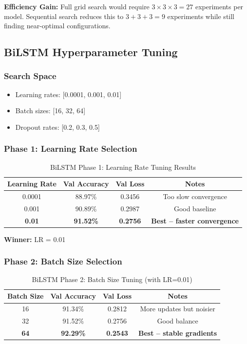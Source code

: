 \documentclass[12pt,a4paper]{article}
\begin{document}
\textbf{Efficiency Gain:} Full grid search would require $3 \times 3 \times 3 = 27$ experiments per model. Sequential search reduces this to $3 + 3 + 3 = 9$ experiments while still finding near-optimal configurations.

\subsection{BiLSTM Hyperparameter Tuning}

\subsubsection{Search Space}
\begin{itemize}
    \item Learning rates: [0.0001, 0.001, 0.01]
    \item Batch sizes: [16, 32, 64]
    \item Dropout rates: [0.2, 0.3, 0.5]
\end{itemize}

\subsubsection{Phase 1: Learning Rate Selection}
\begin{table}[H]
\centering
\begin{tabular}{@{}cccc@{}}
\toprule
\textbf{Learning Rate} & \textbf{Val Accuracy} & \textbf{Val Loss} & \textbf{Notes} \\ \midrule
0.0001 & 88.97\% & 0.3456 & Too slow convergence \\
0.001 & 90.89\% & 0.2987 & Good baseline \\
\rowcolor{green!20}\textbf{0.01} & \textbf{91.52\%} & \textbf{0.2756} & \textbf{Best -- faster convergence} \\ \bottomrule
\end{tabular}
\caption{BiLSTM Phase 1: Learning Rate Tuning Results}
\label{tab:bilstm_lr}
\end{table}

\textbf{Winner:} LR = 0.01

\subsubsection{Phase 2: Batch Size Selection}
\begin{table}[H]
\centering
\begin{tabular}{@{}cccc@{}}
\toprule
\textbf{Batch Size} & \textbf{Val Accuracy} & \textbf{Val Loss} & \textbf{Notes} \\ \midrule
16 & 91.34\% & 0.2812 & More updates but noisier \\
32 & 91.52\% & 0.2756 & Good balance \\
\rowcolor{green!20}\textbf{64} & \textbf{92.29\%} & \textbf{0.2543} & \textbf{Best -- stable gradients} \\ \bottomrule
\end{tabular}
\caption{BiLSTM Phase 2: Batch Size Tuning (with LR=0.01)}
\label{tab:bilstm_batch}
\end{table}
\end{document}
